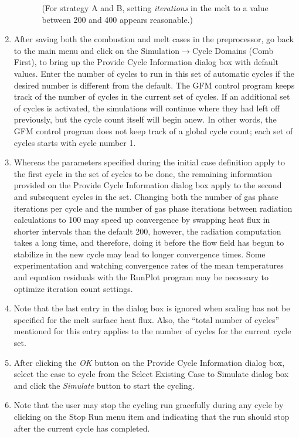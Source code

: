\documentclass[12pt]{article}
\newcommand{\sub}[1]{\textsf{#1}}
\newcommand{\menu}[1]{\textsf{#1}}
\newcommand{\smenu}[2]{\textsf{#1$\to$#2}}
\newcommand{\parm}[1]{\textit{#1}}
\newcommand{\dialog}[1]{\textsf{#1}}
\numberwithin{equation}{section}
\begin{document}
\begin{enumerate}
\begin{itemize}
\begin{itemize}
(For strategy A and B, setting \parm{iterations} in the melt to a value between 200 and 400 appears reasonable.)   					\end{itemize}   
	\end{itemize}
	\item After saving both the combustion and melt cases in the preprocessor, go back to the main menu
and click on the \smenu{Simulation}{Cycle Domains (Comb First)}, to bring up the \dialog{Provide Cycle Information} dialog box with default values. Enter the number of cycles to run in this set of automatic cycles if the desired number is different from the default. The GFM control program keeps track of the number of cycles in the current set of cycles. If an additional set of cycles is activated, the simulations will continue where they had left off previously, but the cycle count itself will begin anew. In other words, the GFM control program does not keep track of a global cycle count; each set of cycles starts with cycle number 1.  
	\item Whereas the parameters specified during the initial case definition apply to the first cycle in the set of cycles to be done, the remaining information provided on the \dialog{Provide Cycle Information} dialog box apply to the second and subsequent cycles in the set. Changing both the number of gas phase iterations per cycle and the number of gas phase iterations between radiation calculations to 100 may speed up convergence by swapping heat flux in shorter intervals than the default 200, however, the radiation computation takes a long time, and therefore, doing it before the flow field has begun to stabilize in the new cycle may lead to longer convergence times. Some experimentation and watching convergence rates of the mean temperatures and equation residuals with the \sub{RunPlot} program may be necessary to optimize iteration count settings. 
	\item Note that the last entry in the dialog box is ignored when scaling has not be specified for the melt surface heat flux. Also, the ``total number of cycles'' mentioned for this entry applies to the number of cycles for the current cycle set.  
	\item After clicking the \parm{OK} button on the \dialog{Provide Cycle Information} dialog box, select the case to cycle from the \dialog{Select Existing Case to Simulate} dialog box and click the \parm{Simulate} button to start the cycling.
	\item Note that the user may stop the cycling run gracefully during any cycle by clicking on the \menu{Stop Run} menu item and indicating that the run should stop after the current cycle has completed.
\end{enumerate}
\end{document}
